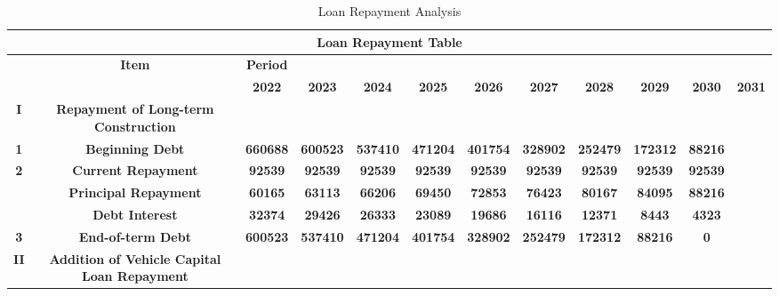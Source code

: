 \documentclass[12pt]{article}
\begin{document}
\begin{table}[htbp]
\scriptsize
  \centering
  \caption{Loan Repayment Analysis}
    \begin{tabular}{|c|c|c|c|c|c|c|c|c|c|c|c|}
    \toprule
    \multicolumn{12}{|c|}{\textbf{Loan Repayment Table}} \\
    \hline
    \rowcolor[rgb]{ .973,  .796,  .678}       & \textbf{Item} & \textbf{Period} &       &       &       &       &       &       &       &       &  \\
    \hline
    \rowcolor[rgb]{ .988,  .894,  .839}       &       & \textbf{2022} & \textbf{2023} & \textbf{2024} & \textbf{2025} & \textbf{2026} & \textbf{2027} & \textbf{2028} & \textbf{2029} & \textbf{2030} & \textbf{2031} \\
    \hline
    \rowcolor[rgb]{ .973,  .796,  .678} \textbf{I} & \multicolumn{1}{p{10.055em}|}{\textbf{Repayment of Long-term\newline{} Construction}} &       &       &       &       &       &       &       &       &       &  \\
    \hline
    \rowcolor[rgb]{ .988,  .894,  .839} \textbf{1} & \textbf{Beginning Debt} & \textbf{660688} & \textbf{600523} & \textbf{537410} & \textbf{471204} & \textbf{401754} & \textbf{328902} & \textbf{252479} & \textbf{172312} & \textbf{88216} &  \\
    \hline
    \rowcolor[rgb]{ .973,  .796,  .678} \textbf{2} & \textbf{Current Repayment} & \textbf{92539} & \textbf{92539} & \textbf{92539} & \textbf{92539} & \textbf{92539} & \textbf{92539} & \textbf{92539} & \textbf{92539} & \textbf{92539} &  \\
    \hline
    \rowcolor[rgb]{ .988,  .894,  .839}       & \textbf{Principal Repayment} & \textbf{60165} & \textbf{63113} & \textbf{66206} & \textbf{69450} & \textbf{72853} & \textbf{76423} & \textbf{80167} & \textbf{84095} & \textbf{88216} &  \\
    \hline
    \rowcolor[rgb]{ .973,  .796,  .678}       & \textbf{Debt Interest} & \textbf{32374} & \textbf{29426} & \textbf{26333} & \textbf{23089} & \textbf{19686} & \textbf{16116} & \textbf{12371} & \textbf{8443} & \textbf{4323} &  \\
    \hline
    \rowcolor[rgb]{ .988,  .894,  .839} \textbf{3} & \textbf{End-of-term Debt} & \textbf{600523} & \textbf{537410} & \textbf{471204} & \textbf{401754} & \textbf{328902} & \textbf{252479} & \textbf{172312} & \textbf{88216} & \textbf{0} &  \\
    \hline
    \rowcolor[rgb]{ .973,  .796,  .678} \textbf{II} & \multicolumn{1}{p{10.055em}|}{\textbf{Addition of Vehicle Capital \newline{}Loan Repayment}} &       &       &       &       &       &       &       &       &       &  \\

\end{tabular}
\end{table}
\end{document}
